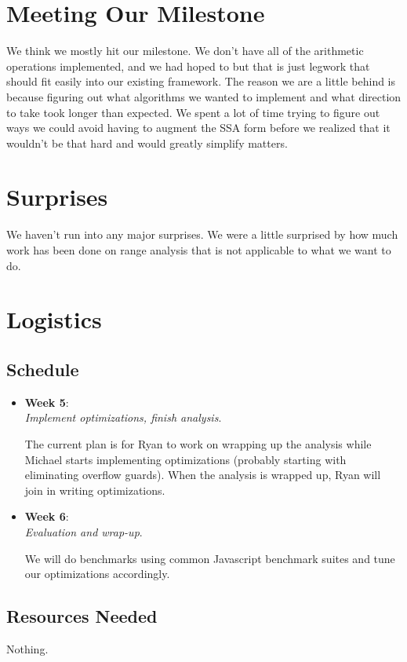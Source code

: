 \documentclass{article}
\begin{document}
\section{Meeting Our Milestone}

We think we mostly hit our milestone. We don't have all of the
arithmetic operations implemented, and we had hoped to but that is
just legwork that should fit easily into our existing framework.
The reason we are a little behind is because figuring out what
algorithms we wanted to implement and what direction to take took
longer than expected. We spent a lot of time trying to figure out ways
we could avoid having to augment the SSA form before we realized that
it wouldn't be that hard and would greatly simplify matters.

\section{Surprises}

We haven't run into any major surprises. We were a little surprised by
how much work has been done on range analysis that is not applicable
to what we want to do.


\section{Logistics}
\subsection{Schedule}
\begin{itemize}
\item \textbf{Week 5}:\\
\textit{Implement optimizations, finish analysis}.

The current plan is for Ryan to work on wrapping up the analysis while
Michael starts implementing optimizations (probably starting with
eliminating overflow guards). When the analysis is wrapped up, Ryan
will join in writing optimizations.

\item \textbf{Week 6}:\\
\textit{Evaluation and wrap-up}.

We will do benchmarks using common Javascript benchmark suites and
tune our optimizations accordingly.

\end{itemize}

\subsection{Resources Needed}
Nothing.
\end{document}
